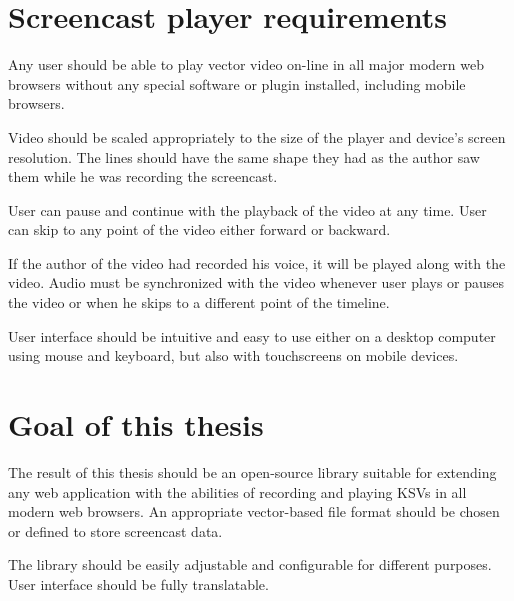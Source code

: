 \section{Screencast player requirements}
Any user should be able to play vector video on-line in all major modern web browsers without any special software or plugin installed, including mobile browsers.

Video should be scaled appropriately to the size of the player and device's screen resolution. The lines should have the same shape they had as the author saw them while he was recording the screencast.

User can pause and continue with the playback of the video at any time. User can skip to any point of the video either forward or backward.

If the author of the video had recorded his voice, it will be played along with the video. Audio must be synchronized with the video whenever user plays or pauses the video or when he skips to a different point of the timeline.

User interface should be intuitive and easy to use either on a desktop computer using mouse and keyboard, but also with touchscreens on mobile devices.

\section{Goal of this thesis}

The result of this thesis should be an open-source library suitable for extending any web application with the abilities of recording and playing KSVs in all modern web browsers. An appropriate vector-based file format should be chosen or defined to store screencast data.

The library should be easily adjustable and configurable for different purposes. User interface should be fully translatable.